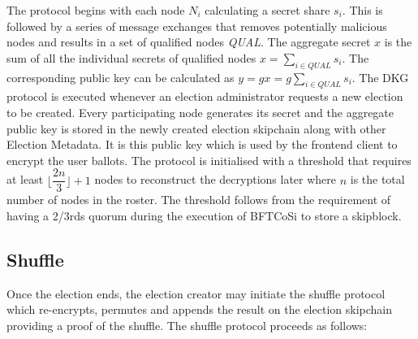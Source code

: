 The protocol begins with each node $N_i$ calculating a secret share $s_i$. This is followed by a series of message exchanges that removes potentially malicious nodes and results in a set of qualified nodes \textit{QUAL}. The aggregate secret $x$ is the sum of all the individual secrets of qualified nodes
$x = \sum_{i \in \textit{QUAL}}s_i$. The corresponding public key can be calculated as \(y = gx = g\sum_{i \in \textit{QUAL}}s_i \). The DKG protocol is executed whenever an election administrator requests a new election to be created. Every participating node generates its secret and the aggregate public key is stored in the newly created election skipchain along with other Election Metadata. It is this public key which is used by the frontend client to encrypt the user ballots. The protocol is initialised with a threshold that requires at least \( \lfloor\dfrac{2n}{3}\rfloor + 1 \) nodes to reconstruct the decryptions later where $n$ is the total number of nodes in the roster. The threshold follows from the requirement of having a 2/3rds quorum during the execution of BFTCoSi to store a skipblock.

\subsection{Shuffle}

Once the election ends, the election creator may initiate the shuffle protocol which re-encrypts, permutes and appends the result on the election skipchain providing a proof of the shuffle. The shuffle protocol proceeds as follows:

